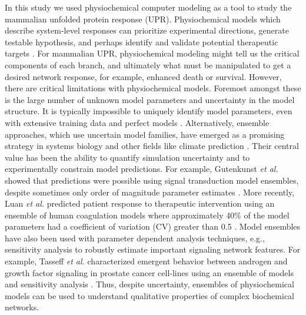 \documentclass[fleqn,10pt]{wlscirep}
\begin{document}
In this study we used physiochemical computer modeling as a tool to study the mammalian unfolded protein response (UPR). Physiochemical models which describe system-level responses can prioritize experimental directions, generate testable hypothesis, and perhaps identify and validate potential therapeutic targets \cite{KITANO2007}. For mammalian UPR, physiochemical modeling might tell us the critical components of each branch, and ultimately what must be manipulated to get a desired network response, for example, enhanced death or survival. However, there are critical limitations with physiochemical models. Foremost amongst these is the large number of unknown model parameters and uncertainty in the model structure. It is typically impossible to uniquely identify model parameters, even with extensive training data and perfect models \cite{Gadkar:2005ad}. Alternatively, ensemble approaches, which use uncertain model families, have emerged as a promising strategy in systems biology and other fields like climate prediction \cite{Battogtokh:2002uq,Kuepfer:2007,Brown:2003qy,Palmer:2005,Song:2009uq}. Their central value has been the ability to quantify simulation uncertainty and to experimentally constrain model predictions. For example, Gutenkunst \emph{et al.} showed that predictions were possible using signal transduction model ensembles, despite sometimes only order of magnitude parameter estimates \cite{Gutenkunst:2007oq}. More recently, Luan \emph{et al.} predicted patient response to therapeutic intervention using an ensemble of human coagulation models where approximately 40\% of the model parameters had a coefficient of variation (CV) greater than 0.5 \cite{Luan:2010fc}. Model ensembles have also been used with parameter dependent analysis techniques, e.g., sensitivity analysis to robustly estimate important signaling network features. For example, Tasseff \emph{et al.} characterized emergent behavior between androgen and growth factor signaling in prostate cancer cell-lines using an ensemble of models and sensitivity analysis \cite{Tasseff:2010rq}. Thus, despite uncertainty, ensembles of physiochemical models can be used to understand qualitative properties of complex biochemical networks. 
\end{document}
